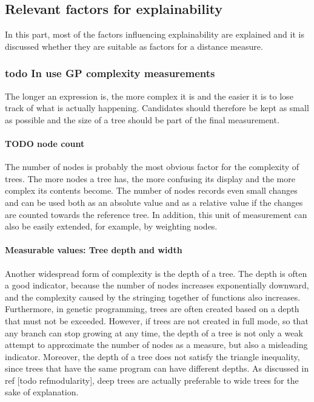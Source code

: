 \subsection{Relevant factors for explainability}

In this part, most of the factors influencing explainability are explained and it is discussed whether they are suitable as factors for a distance measure. 

\subsubsection{todo In use GP complexity measurements}

The longer an expression is, the more complex it is and the easier it is to lose track of what is actually happening. Candidates should therefore be kept as small as possible and the size of a tree should be part of the final measurement. 

\paragraph{TODO node count \label{eq:expl:nodeCount}}
The number of nodes is probably the most obvious factor for the complexity of trees. The more nodes a tree has, the more confusing its display and the more complex its contents become. The number of nodes records even small changes and can be used both as an absolute value and as a relative value if the changes are counted towards the reference tree. In addition, this unit of measurement can also be easily extended, for example, by weighting nodes.

\paragraph{Measurable values: Tree depth and width  \label{eq:expl:treeDepth}}
Another widespread form of complexity is the depth of a tree. The depth is often a good indicator, because the number of nodes increases exponentially downward, and the complexity caused by the stringing together of functions also increases. Furthermore, in genetic programming, trees are often created based on a depth that must not be exceeded. However, if trees are not created in full mode, so that any branch can stop growing at any time, the depth of a tree is not only a weak attempt to approximate the number of nodes as a measure, but also a misleading indicator.
Moreover, the depth of a tree does not satisfy the triangle inequality, since trees that have the same program can have different depths.
As discussed in ref [todo refmodularity], deep trees are actually preferable to wide trees for the sake of explanation.

